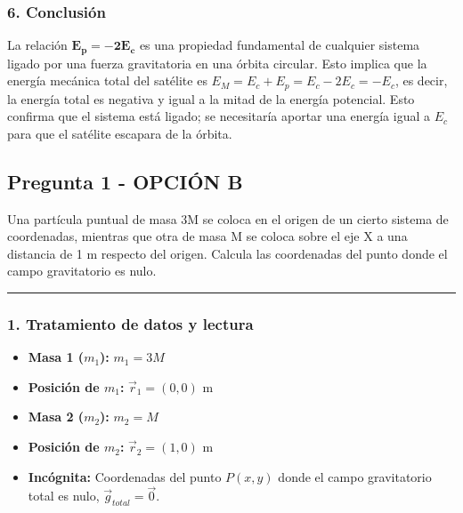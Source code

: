 \subsubsection*{6. Conclusión}
\begin{cajaconclusion}
La relación $\mathbf{E_p = -2E_c}$ es una propiedad fundamental de cualquier sistema ligado por una fuerza gravitatoria en una órbita circular. Esto implica que la energía mecánica total del satélite es $E_M = E_c + E_p = E_c - 2E_c = -E_c$, es decir, la energía total es negativa y igual a la mitad de la energía potencial. Esto confirma que el sistema está ligado; se necesitaría aportar una energía igual a $E_c$ para que el satélite escapara de la órbita.
\end{cajaconclusion}

\newpage

\subsection{Pregunta 1 - OPCIÓN B}
\label{subsec:1B_2003_jun_ord}

\begin{cajaenunciado}
Una partícula puntual de masa 3M se coloca en el origen de un cierto sistema de coordenadas, mientras que otra de masa M se coloca sobre el eje X a una distancia de 1 m respecto del origen. Calcula las coordenadas del punto donde el campo gravitatorio es nulo.
\end{cajaenunciado}
\hrule

\subsubsection*{1. Tratamiento de datos y lectura}
\begin{itemize}
    \item \textbf{Masa 1 ($m_1$):} $m_1 = 3M$
    \item \textbf{Posición de $m_1$:} $\vec{r}_1 = (0,0)$ m
    \item \textbf{Masa 2 ($m_2$):} $m_2 = M$
    \item \textbf{Posición de $m_2$:} $\vec{r}_2 = (1,0)$ m
    \item \textbf{Incógnita:} Coordenadas del punto $P(x,y)$ donde el campo gravitatorio total es nulo, $\vec{g}_{total} = \vec{0}$.
\end{itemize}


